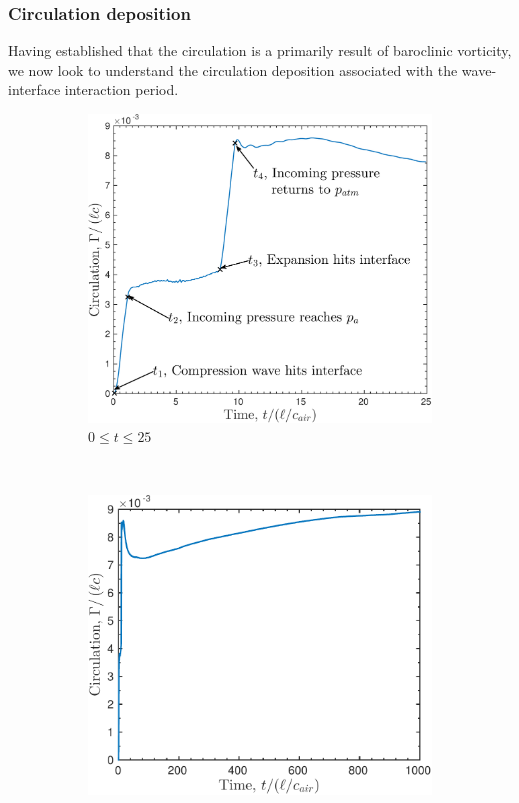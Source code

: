 \documentclass{jfm}%
\begin{document}
\subsubsection{Circulation deposition}
Having established that the circulation is a primarily result of
baroclinic vorticity, we now look to understand the circulation
deposition associated with the wave-interface interaction period.
%
\begin{figure}
  \centering
  \begin{subfigure}[b]{0.48\textwidth}
    \centering
    \includegraphics[width=\textwidth]{./figs/lung_figs/trapz10_circ_schematic.pdf}
    \caption{\label{fig:trapz10_circ_schematic_t25} $0\leq t \leq 25$ }
  \end{subfigure}
  ~
  \begin{subfigure}[b]{0.48\textwidth}
    \centering
    \includegraphics[width=\textwidth]{./figs/lung_figs/Gamma_t1000_28-Oct-2016.pdf}

\end{subfigure}
\end{figure}
\end{document}
